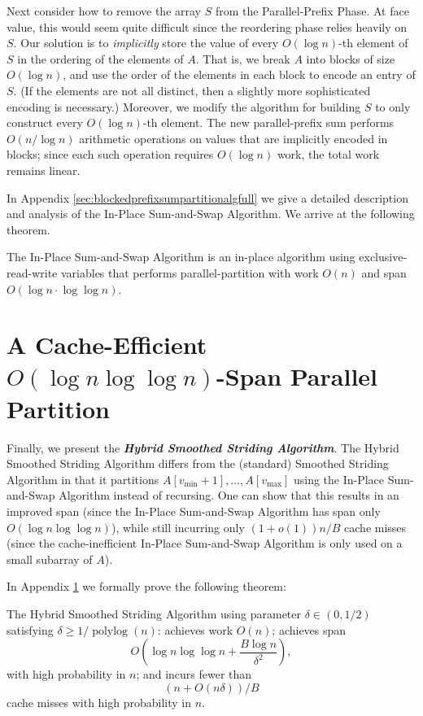 \documentclass[a4paper,UKenglish,cleveref, autoref, thm-restate]{lipics-v2019}
\DeclareMathOperator{\polylog}{\text{polylog}}
\newcommand{\defn}[1]{{\textit{\textbf{\boldmath #1}}}}
\begin{document}
Next consider how to remove the array $S$ from the Parallel-Prefix
Phase. At face value, this would seem quite difficult since the
reordering phase relies heavily on $S$. Our solution is to
\emph{implicitly} store the value of every $O(\log n)$-th element of
$S$ in the ordering of the elements of $A$. That is, we break $A$ into
blocks of size $O(\log n)$, and use the order of the elements in each
block to encode an entry of $S$. (If the elements are not all
  distinct, then a slightly more sophisticated encoding is necessary.)
Moreover, we modify the algorithm for building $S$ to only construct
every $O(\log n)$-th element. The new parallel-prefix sum performs
$O(n / \log n)$ arithmetic operations on values that are implicitly
encoded in blocks; since each such operation requires $O(\log n)$
work, the total work remains linear.

In Appendix \ref{sec:blockedprefixsumpartitionalgfull} we give a detailed description and analysis of the In-Place Sum-and-Swap Algorithm. We arrive at the following theorem.  
\begin{theorem}
  The In-Place Sum-and-Swap Algorithm is an in-place algorithm using
  exclusive-read-write variables that performs parallel-partition with
  work $O(n)$ and span $O(\log n \cdot \log \log n)$.
\end{theorem}

\section{A Cache-Efficient $O(\log n \log \log n)$-Span Parallel Partition}
\label{sec:hybridSmoothedStriding}

Finally, we present the \defn{Hybrid Smoothed Striding Algorithm}. The
Hybrid Smoothed Striding Algorithm differs from the (standard)
Smoothed Striding Algorithm in that it partitions
$A[v_{\text{min}} + 1], \ldots, A[v_{\text{max}}]$ using the In-Place
Sum-and-Swap Algorithm instead of recursing.  One can show that this
results in an improved span (since the In-Place Sum-and-Swap Algorithm
has span only $O(\log n \log \log n)$), while still incurring only
$(1 + o(1))n/B$ cache misses (since the cache-inefficient In-Place
Sum-and-Swap Algorithm is only used on a small subarray of $A$).

In Appendix \ref{sec:hybridSmoothedStriding} we formally prove the
following theorem:

\begin{theorem}
  The Hybrid Smoothed Striding Algorithm using parameter
  $\delta\in(0,1/2)$ satisfying $\delta \ge 1/\polylog(n)$: achieves
  work $O(n)$; achieves span
  $$O\left(\log n \log\log n +\frac{B\log n}{\delta^2}\right),$$ with
  high probability in $n$; and incurs fewer than
  $$(n+O(n\delta))/B$$ cache misses with high probability in $n$.
\end{theorem}
\end{document}
